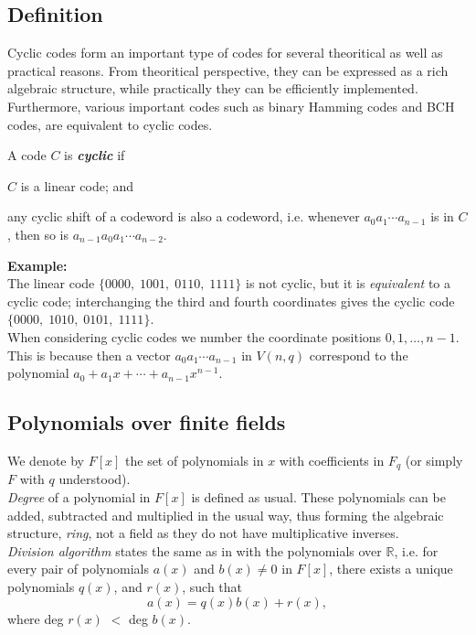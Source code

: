 \documentclass[../main.tex]{subfiles}
\newcommand{\poly}[1]{$#1(x)$}
\begin{document}
\subsection{Definition}

Cyclic codes form an important type of codes for several theoritical as well as practical reasons. From theoritical perspective, they can be expressed as a rich algebraic structure, while practically they can be efficiently implemented. Furthermore, various important codes such as binary Hamming codes and BCH codes, are equivalent to cyclic codes.\\

\begin{defn}
	A code $C$ is \textbf{\emph{cyclic}} if 
	\begin{enumerate*}[label=(\roman*), before=\unskip{}]
		\item $C$ is a linear code; and 
		\item any cyclic shift of a codeword is also a codeword, i.e. whenever $a_0a_1\cdots a_{n-1}$ is in $C$, then so is $a_{n-1}a_0a_1\cdots a_{n-2}$.
	\end{enumerate*}
\end{defn}

\textbf{Example:}\\
The linear code $\{ 0000,\; 1001,\; 0110,\; 1111 \}$ is not cyclic, but it is \emph{equivalent} to a cyclic code; interchanging the third and fourth coordinates gives the cyclic code $\{ 0000,\; 1010,\; 0101,\; 1111 \}$.\\

When considering cyclic codes we number the coordinate positions $0,1,\ldots,n-1$. This is because then a vector $a_0a_1\cdots a_{n-1}$ in $V(n,q)$ correspond to the polynomial $a_0 + a_1x + \cdots +a_{n-1}x^{n-1}$.

\subsection{Polynomials over finite fields}

We denote by $F[x]$ the set of polynomials in $x$ with coefficients in $F_q$ (or simply $F$ with $q$ understood).\\

\emph{Degree} of a polynomial in $F[x]$ is defined as usual. These polynomials can be added, subtracted and multiplied in the usual way, thus forming the algebraic structure, \emph{ring}, not a field as they do not have multiplicative inverses.\\
\emph{Division algorithm} states the same as in with the polynomials over $\mathbb{R}$, i.e. for every pair of polynomials $a(x)$ and $b(x)\neq 0$ in $F[x]$, there exists a unique polynomials $q(x)$, and $r(x)$, such that
\[
	a(x) = q(x)b(x) + r(x),
\] 
where deg \poly{r} $<$ deg \poly{b}.\\
\end{document}
